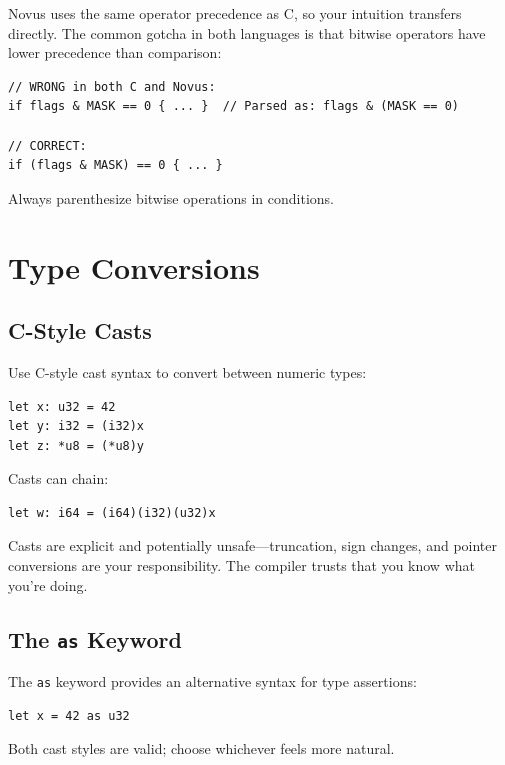 \begin{comingfromc}
Novus uses the same operator precedence as C, so your intuition transfers directly. The common gotcha in both languages is that bitwise operators have lower precedence than comparison:

\begin{lstlisting}
// WRONG in both C and Novus:
if flags & MASK == 0 { ... }  // Parsed as: flags & (MASK == 0)

// CORRECT:
if (flags & MASK) == 0 { ... }
\end{lstlisting}

Always parenthesize bitwise operations in conditions.
\end{comingfromc}

\section{Type Conversions}

\subsection{C-Style Casts}

Use C-style cast syntax to convert between numeric types:

\begin{lstlisting}
let x: u32 = 42
let y: i32 = (i32)x
let z: *u8 = (*u8)y
\end{lstlisting}

Casts can chain:

\begin{lstlisting}
let w: i64 = (i64)(i32)(u32)x
\end{lstlisting}

Casts are explicit and potentially unsafe---truncation, sign changes, and pointer conversions are your responsibility. The compiler trusts that you know what you're doing.

\subsection{The \texttt{as} Keyword}

The \texttt{as} keyword provides an alternative syntax for type assertions:

\begin{lstlisting}
let x = 42 as u32
\end{lstlisting}

Both cast styles are valid; choose whichever feels more natural.

